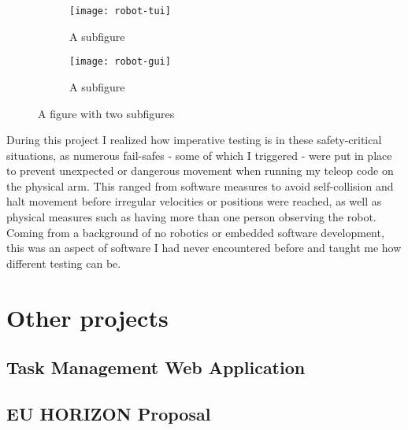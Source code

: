 \begin{figure}
    \centering
    \begin{subfigure}{.5\textwidth}
        \centering
        \texttt{[image: robot-tui]}
        \caption{A subfigure}
        \label{fig:sub1}
    \end{subfigure}%
    \begin{subfigure}{.5\textwidth}
        \centering
        \texttt{[image: robot-gui]}
        \caption{A subfigure}
        \label{fig:sub2}
    \end{subfigure}
    \caption{A figure with two subfigures}
    \label{fig:test}
\end{figure}

During this project I realized how imperative testing is in these safety-critical situations, as
numerous fail-safes - some of which I triggered - were put in place to prevent unexpected or
dangerous movement when running my teleop code on the physical arm. This ranged from software
measures to avoid self-collision and halt movement before irregular velocities or positions were
reached, as well as physical measures such as having more than one person observing the robot.
Coming from a background of no robotics or embedded software development, this was an aspect of
software I had never encountered before and taught me how different testing can be.

\section{Other projects}

\subsection{Task Management Web Application}

\subsection{EU HORIZON Proposal}


